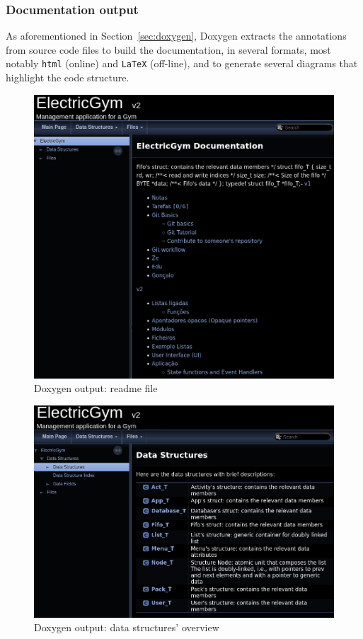 \subsubsection{Documentation output}
\label{sec:documentation-output}
As aforementioned in Section~\ref{sec:doxygen}, Doxygen extracts the annotations
from source code files to build the documentation, in several formats, most
notably \texttt{html} (online) and \texttt{LaTeX} (off-line), and to generate
several diagrams that highlight the code structure.

%
\begin{figure}[htb!]
\centering
    \includegraphics[width=0.8\columnwidth]{./img/doxygen-out1.png}
  \caption{Doxygen output: readme file}%
\label{fig:doxygen-out1}
\end{figure}
%
\begin{figure}[htb!]
\centering
    \includegraphics[width=0.8\columnwidth]{./img/doxygen-out2.png}
  \caption{Doxygen output: data structures' overview}%
\label{fig:doxygen-out2}
\end{figure}
